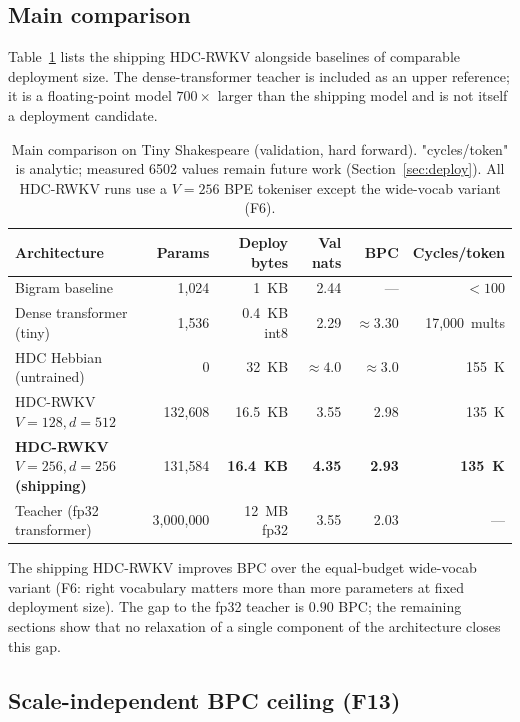 \documentclass[runningheads]{llncs}
\begin{document}
\subsection{Main comparison}
\label{sec:results:main}

Table~\ref{tab:main} lists the shipping HDC-RWKV alongside baselines
of comparable deployment size. The dense-transformer teacher is
included as an upper reference; it is a floating-point model $700\times$
larger than the shipping model and is not itself a deployment candidate.

\begin{table}[t]
\centering
\caption{Main comparison on Tiny Shakespeare (validation, hard
forward). "cycles/token" is analytic; measured 6502 values remain
future work (Section~\ref{sec:deploy}). All HDC-RWKV runs use a
$V{=}256$ BPE tokeniser except the wide-vocab variant (F6).}
\label{tab:main}
\small
\begin{tabular}{@{}lrrrrr@{}}
\toprule
Architecture                    & Params  & Deploy bytes & Val nats & BPC & Cycles/token \\
\midrule
Bigram baseline                 & $\phantom{00}$1{,}024  & 1~KB       & 2.44 & --- & $<100$ \\
Dense transformer (tiny)        & $\phantom{00}$1{,}536  & 0.4~KB int8 & 2.29 & ${\approx}3.30$ & 17{,}000~mults \\
HDC Hebbian (untrained)         & 0                        & 32~KB      & ${\approx}4.0$  & ${\approx}3.0$ & 155~K \\
HDC-RWKV $V{=}128, d{=}512$    & 132{,}608                & 16.5~KB    & 3.55 & 2.98 & 135~K \\
\textbf{HDC-RWKV $V{=}256, d{=}256$ (shipping)} & 131{,}584   & \textbf{16.4~KB} & \textbf{4.35} & \textbf{2.93} & \textbf{135~K} \\
Teacher (fp32 transformer)      & 3{,}000{,}000            & 12~MB fp32 & 3.55 & 2.03 & --- \\
\bottomrule
\end{tabular}
\end{table}

The shipping HDC-RWKV improves BPC over the equal-budget wide-vocab variant
(F6: right vocabulary matters more than more parameters at fixed
deployment size). The gap to the fp32 teacher is $0.90$ BPC; the
remaining sections show that no relaxation of a single component of
the architecture closes this gap.

\subsection{Scale-independent BPC ceiling (F13)}
\label{sec:results:scale}
\end{document}
